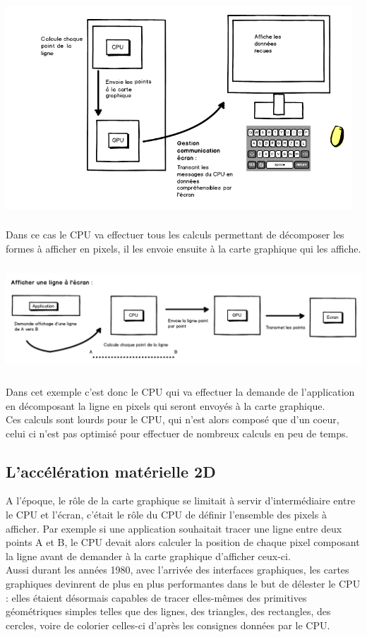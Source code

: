 \begin{center}
\includegraphics[width=13cm,height=8cm]{img/cpuRaster.png}

Dans ce cas le CPU va effectuer tous les calculs permettant de décomposer les formes à afficher en pixels, il les envoie ensuite à la carte graphique qui les affiche.


\includegraphics[width=15cm,height=4cm]{img/cpuRasterExemple.png}

Dans cet exemple c'est donc le CPU qui va effectuer la demande de l'application en décomposant la ligne en pixels qui seront envoyés à la carte graphique.\\
Ces calculs sont lourds pour le CPU, qui n'est alors composé que d'un coeur, celui ci n'est pas optimisé pour effectuer de nombreux calculs en peu de temps.

\end{center}
\newpage

\subsection{L'accélération matérielle 2D}

A l'époque, le rôle de la carte graphique se limitait à servir d'intermédiaire entre le CPU et l'écran, c'était le rôle du CPU de définir l'ensemble des pixels à afficher. Par exemple si une application souhaitait tracer une ligne entre deux points A et B, le CPU devait alors calculer la position de chaque pixel composant la ligne avant de demander à la carte graphique d'afficher ceux-ci.\\
Aussi durant les années 1980, avec l'arrivée des interfaces graphiques, les cartes graphiques devinrent de plus en plus performantes dans le but de délester le CPU : elles étaient désormais capables de tracer elles-mêmes des primitives géométriques simples telles que des lignes, des triangles, des rectangles, des cercles, voire de colorier celles-ci d'après les consignes données par le CPU.\\

